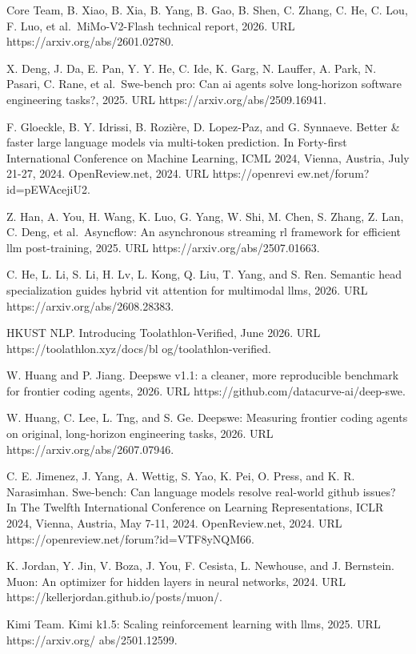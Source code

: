 Core Team, B. Xiao, B. Xia, B. Yang, B. Gao, B. Shen, C. Zhang, C. He,
C. Lou, F. Luo, et al.~MiMo-V2-Flash technical report, 2026. URL
https://arxiv.org/abs/2601.02780.

X. Deng, J. Da, E. Pan, Y. Y. He, C. Ide, K. Garg, N. Lauffer, A. Park,
N. Pasari, C. Rane, et al.~Swe-bench pro: Can ai agents solve
long-horizon software engineering tasks?, 2025. URL
https://arxiv.org/abs/2509.16941.



F. Gloeckle, B. Y. Idrissi, B. Rozière, D. Lopez-Paz, and G. Synnaeve.
Better \& faster large language models via multi-token prediction. In
Forty-first International Conference on Machine Learning, ICML 2024,
Vienna, Austria, July 21-27, 2024. OpenReview.net, 2024. URL
https://openrevi ew.net/forum?id=pEWAcejiU2.

Z. Han, A. You, H. Wang, K. Luo, G. Yang, W. Shi, M. Chen, S. Zhang, Z.
Lan, C. Deng, et al.~Asyncflow: An asynchronous streaming rl framework
for efficient llm post-training, 2025. URL
https://arxiv.org/abs/2507.01663.

C. He, L. Li, S. Li, H. Lv, L. Kong, Q. Liu, T. Yang, and S. Ren.
Semantic head specialization guides hybrid vit attention for multimodal
llms, 2026. URL https://arxiv.org/abs/2608.28383.

HKUST NLP. Introducing Toolathlon-Verified, June 2026. URL
https://toolathlon.xyz/docs/bl og/toolathlon-verified.

W. Huang and P. Jiang. Deepswe v1.1: a cleaner, more reproducible
benchmark for frontier coding agents, 2026. URL
https://github.com/datacurve-ai/deep-swe.

W. Huang, C. Lee, L. Tng, and S. Ge. Deepswe: Measuring frontier coding
agents on original, long-horizon engineering tasks, 2026. URL
https://arxiv.org/abs/2607.07946.

C. E. Jimenez, J. Yang, A. Wettig, S. Yao, K. Pei, O. Press, and K. R.
Narasimhan. Swe-bench: Can language models resolve real-world github
issues? In The Twelfth International Conference on Learning
Representations, ICLR 2024, Vienna, Austria, May 7-11, 2024.
OpenReview.net, 2024. URL https://openreview.net/forum?id=VTF8yNQM66.

K. Jordan, Y. Jin, V. Boza, J. You, F. Cesista, L. Newhouse, and J.
Bernstein. Muon: An optimizer for hidden layers in neural networks,
2024. URL https://kellerjordan.github.io/posts/muon/.

Kimi Team. Kimi k1.5: Scaling reinforcement learning with llms, 2025.
URL https://arxiv.org/ abs/2501.12599.

